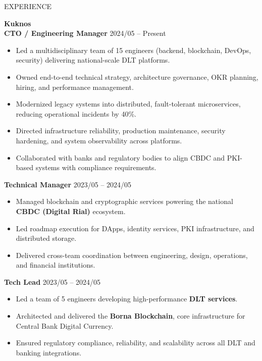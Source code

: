 \documentclass{resume}
\begin{document}

\begin{rSection}{EXPERIENCE}

\textbf{Kuknos} \hfill \\
\textbf{CTO / Engineering Manager} \hfill 2024/05 -- Present
\begin{itemize}
    \item Led a multidisciplinary team of 15 engineers (backend, blockchain, DevOps, security) delivering national-scale DLT platforms.
    \item Owned end-to-end technical strategy, architecture governance, OKR planning, hiring, and performance management.
    \item Modernized legacy systems into distributed, fault-tolerant microservices, reducing operational incidents by 40\%.
    \item Directed infrastructure reliability, production maintenance, security hardening, and system observability across platforms.
    \item Collaborated with banks and regulatory bodies to align CBDC and PKI-based systems with compliance requirements.
\end{itemize}

\textbf{Technical Manager} \hfill 2023/05 -- 2024/05
\begin{itemize}
    \item Managed blockchain and cryptographic services powering the national \textbf{CBDC (Digital Rial)} ecosystem.
    \item Led roadmap execution for DApps, identity services, PKI infrastructure, and distributed storage.
    \item Delivered cross-team coordination between engineering, design, operations, and financial institutions.
\end{itemize}

\textbf{Tech Lead} \hfill 2023/05 -- 2024/05
\begin{itemize}
    \item Led a team of 5 engineers developing high-performance \textbf{DLT services}.
    \item Architected and delivered the \textbf{Borna Blockchain}, core infrastructure for Central Bank Digital Currency.
    \item Ensured regulatory compliance, reliability, and scalability across all DLT and banking integrations.
\end{itemize}


\end{rSection}
\end{document}
